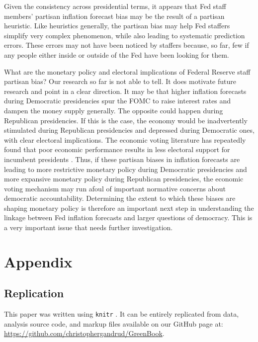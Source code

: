 \documentclass[a4paper]{article}\usepackage{graphicx, color}
\begin{document}
Given the consistency across presidential terms, it appears that Fed staff members' partisan inflation forecast bias may be the result of a partisan heuristic. Like heuristics generally, the partisan bias may help Fed staffers simplify very complex phenomenon, while also leading to systematic prediction errors. These errors may not have been noticed by staffers because, so far, few if any people either inside or outside of the Fed have been looking for them. 

What are the monetary policy and electoral implications of Federal Reserve staff partisan bias? Our research so far is not able to tell. It does motivate future research and point in a clear direction. It may be that higher inflation forecasts during Democratic presidencies spur the FOMC to raise interest rates and dampen the money supply generally. The opposite could happen during Republican presidencies. If this is the case, the economy would be inadvertently stimulated during Republican presidencies and depressed during Democratic ones, with clear electoral implications. The economic voting literature has repeatedly found that poor economic performance results in less electoral support for incumbent presidents \citep[e.g.][]{Bloom1975}. Thus, if these partisan biases in inflation forecasts are leading to more restrictive monetary policy during Democratic presidencies and more expansive monetary policy during Republican presidencies, the economic voting mechanism may run afoul of important normative concerns about democratic accountability. Determining the extent to which these biases are shaping monetary policy is therefore an important next step in understanding the linkage between Fed inflation forecasts and larger questions of democracy. This is a very important issue that needs further investigation.

\clearpage
\section*{Appendix}

\subsection*{Replication}

This paper was written using {\tt{knitr}} \citep{knitr2012}. It can be entirely replicated from data, analysis source code, and markup files available on our GitHub page at: {\url{https://github.com/christophergandrud/GreenBook}}. 
\end{document}
